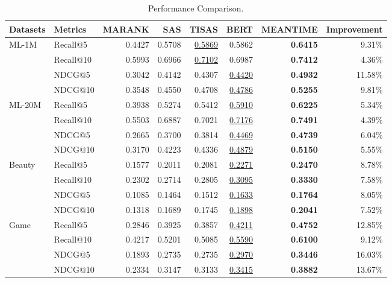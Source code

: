 \begin{table}[t]
\small
\caption{Performance Comparison.}
\label{tab:results}
\begin{tabular}{@{}llrrrrrr@{}}
\toprule
Datasets & Metrics   & MARANK & SAS    & TISAS        & BERT         & MEANTIME        & Improvement \\ \midrule
ML-1M    & Recall@5  & 0.4427 & 0.5708 & \underline{0.5869} & 0.5862       & \textbf{0.6415} & 9.31\%      \\
         & Recall@10 & 0.5993 & 0.6966 & \underline{0.7102} & 0.6987       & \textbf{0.7412} & 4.36\%      \\
         & NDCG@5    & 0.3042 & 0.4142 & 0.4307       & \underline{0.4420} & \textbf{0.4932} & 11.58\%     \\
         & NDCG@10   & 0.3548 & 0.4550 & 0.4708       & \underline{0.4786} & \textbf{0.5255} & 9.81\%      \\
ML-20M   & Recall@5  & 0.3938 & 0.5274 & 0.5412       & \underline{0.5910} & \textbf{0.6225} & 5.34\%      \\
         & Recall@10 & 0.5503 & 0.6887 & 0.7021       & \underline{0.7176} & \textbf{0.7491} & 4.39\%      \\
         & NDCG@5    & 0.2665 & 0.3700 & 0.3814       & \underline{0.4469} & \textbf{0.4739} & 6.04\%      \\
         & NDCG@10   & 0.3170 & 0.4223 & 0.4336       & \underline{0.4879} & \textbf{0.5150} & 5.55\%      \\
Beauty   & Recall@5  & 0.1577 & 0.2011 & 0.2081       & \underline{0.2271} & \textbf{0.2470} & 8.78\%      \\
         & Recall@10 & 0.2302 & 0.2714 & 0.2805       & \underline{0.3095} & \textbf{0.3330} & 7.58\%      \\
         & NDCG@5    & 0.1085 & 0.1464 & 0.1512       & \underline{0.1633} & \textbf{0.1764} & 8.05\%      \\
         & NDCG@10   & 0.1318 & 0.1689 & 0.1745       & \underline{0.1898} & \textbf{0.2041} & 7.52\%      \\
Game     & Recall@5  & 0.2846 & 0.3925 & 0.3857       & \underline{0.4211} & \textbf{0.4752} & 12.85\%     \\
         & Recall@10 & 0.4217 & 0.5201 & 0.5085       & \underline{0.5590} & \textbf{0.6100} & 9.12\%      \\
         & NDCG@5    & 0.1893 & 0.2735 & 0.2735       & \underline{0.2970} & \textbf{0.3446} & 16.03\%     \\
         & NDCG@10   & 0.2334 & 0.3147 & 0.3133       & \underline{0.3415} & \textbf{0.3882} & 13.67\%     \\ \bottomrule
\end{tabular}
\end{table}